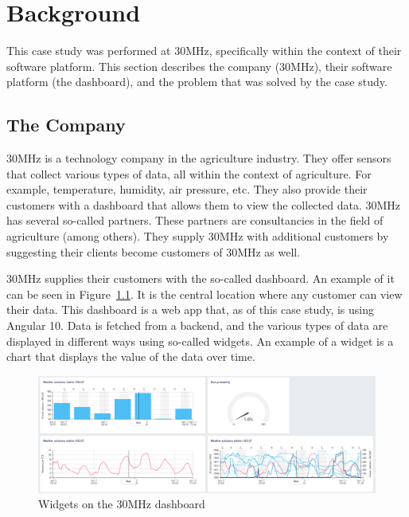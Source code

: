 \chapter{Background}\label{chap:background}

This case study was performed at 30MHz, specifically within the context of their software platform. This section describes the company (30MHz), their software platform (the dashboard), and the problem that was solved by the case study.

\section{The Company}\label{sec:bg:thecompany}
30MHz is a technology company in the agriculture industry. They offer sensors that collect various types of data, all within the context of agriculture. For example, temperature, humidity, air pressure, etc. They also provide their customers with a dashboard that allows them to view the collected data. 30MHz has several so-called partners. These partners are consultancies in the field of agriculture (among others). They supply 30MHz with additional customers by suggesting their clients become customers of 30MHz as well.

30MHz supplies their customers with the so-called dashboard. An example of it can be seen in Figure~\ref{fig:bg:dashboard}. It is the central location where any customer can view their data. This dashboard is a web app that, as of this case study, is using Angular 10. Data is fetched from a backend, and the various types of data are displayed in different ways using so-called widgets. An example of a widget is a chart that displays the value of the data over time.

\begin{figure}[h]
	\includegraphics[width=\columnwidth]{figures/background/dashboard.png}
	\caption{Widgets on the 30MHz dashboard}
	\label{fig:bg:dashboard}
	\centering
\end{figure}

